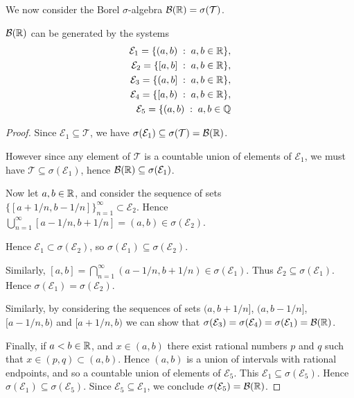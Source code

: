 \documentclass{unswmaths}
\begin{document}
We now consider the Borel $\sigma$-algebra $\mathcal{B}(\mathbb{R}) = \sigma(\mathcal{T})$.
\begin{theorem}
    $\mathcal{B}(\mathbb{R})$ can be generated by the systems
    \begin{align*}
        \mathcal{E}_1 = \{(a,b)\;:\;a,b \in \mathbb{R}\},\\
        \mathcal{E}_2 = \{[a,b]\;:\;a,b \in \mathbb{R}\},\\
        \mathcal{E}_3 = \{(a,b]\;:\;a,b \in \mathbb{R}\},\\
        \mathcal{E}_4 = \{[a,b)\;:\;a,b \in \mathbb{R}\},\\
        \mathcal{E}_5 = \{(a,b)\;:\;a,b \in \mathbb{Q}
    \end{align*}
\end{theorem}
\begin{proof}
    Since $\mathcal{E}_1 \subseteq \mathcal{T}$, we have $\sigma(\mathcal{E}_1) \subseteq \sigma(\mathcal{T}) = \mathcal{B}(\mathbb{R})$.
    
    However since any element of $\mathcal{T}$ is a countable union of elements of $\mathcal{E}_1$,
    we must have $\mathcal{T} \subseteq \sigma(\mathcal{E}_1)$, hence $\mathcal{B}(\mathbb{R}) \subseteq \sigma(\mathcal{E}_1)$.
    
    Now let $a,b \in \mathbb{R}$, and consider the sequence of sets $\{[a+1/n,b-1/n]\}_{n=1}^\infty \subset \mathcal{E}_2$. Hence $\bigcup_{n=1}^\infty [a-1/n,b+1/n] = (a,b) \in \sigma(\mathcal{E_2})$.
    
    Hence $\mathcal{E}_1 \subset \sigma(\mathcal{E}_2)$, so $\sigma(\mathcal{E}_1) \subseteq \sigma(\mathcal{E}_2)$.
    
    Similarly, $[a,b] = \bigcap_{n=1}^\infty (a-1/n,b+1/n) \in \sigma(\mathcal{E}_1)$. 
    Thus $\mathcal{E}_2 \subseteq \sigma(\mathcal{E}_1)$. Hence $\sigma(\mathcal{E}_1) = \sigma(\mathcal{E}_2)$.
    
    Similarly, by considering the sequences of sets $(a,b+1/n]$, $(a,b-1/n]$, $[a-1/n,b)$
    and $[a+1/n,b)$ we can show that $\sigma(\mathcal{E}_3) = \sigma(\mathcal{E}_4) = \sigma(\mathcal{E}_1) = \mathcal{B}(\mathbb{R})$.
    
    
    Finally, if $a < b \in \mathbb{R}$, and $x \in (a,b)$ there exist rational
    numbers $p$ and $q$ such that $x \in (p,q) \subset (a,b)$. Hence 
    $(a,b)$ is a union of intervals with rational endpoints,
    and so a countable union of elements of $\mathcal{E}_5$.
    This $\mathcal{E}_1 \subseteq \sigma(\mathcal{E}_5)$. Hence
    $\sigma(\mathcal{E}_1) \subseteq \sigma(\mathcal{E}_5)$.
    Since $\mathcal{E}_5 \subseteq \mathcal{E}_1$, we conclude
    $\sigma(\mathcal{E}_5) = \mathcal{B}(\mathbb{R})$.
    
\end{proof}
\end{document}
